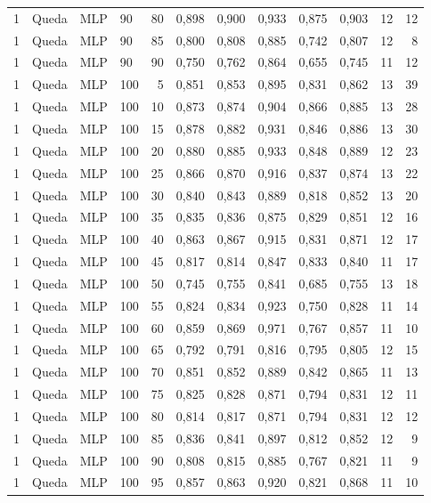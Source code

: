\begin{longtable}{ccclrrrrrrrr}
1 & Queda & MLP & 90 & 80 & 0,898 & 0,900 & 0,933 & 0,875 & 0,903 & 12 & 12 \\
1 & Queda & MLP & 90 & 85 & 0,800 & 0,808 & 0,885 & 0,742 & 0,807 & 12 & 8 \\
1 & Queda & MLP & 90 & 90 & 0,750 & 0,762 & 0,864 & 0,655 & 0,745 & 11 & 12 \\
1 & Queda & MLP & 100 & 5 & 0,851 & 0,853 & 0,895 & 0,831 & 0,862 & 13 & 39 \\
1 & Queda & MLP & 100 & 10 & 0,873 & 0,874 & 0,904 & 0,866 & 0,885 & 13 & 28 \\
1 & Queda & MLP & 100 & 15 & 0,878 & 0,882 & 0,931 & 0,846 & 0,886 & 13 & 30 \\
1 & Queda & MLP & 100 & 20 & 0,880 & 0,885 & 0,933 & 0,848 & 0,889 & 12 & 23 \\
1 & Queda & MLP & 100 & 25 & 0,866 & 0,870 & 0,916 & 0,837 & 0,874 & 13 & 22 \\
1 & Queda & MLP & 100 & 30 & 0,840 & 0,843 & 0,889 & 0,818 & 0,852 & 13 & 20 \\
1 & Queda & MLP & 100 & 35 & 0,835 & 0,836 & 0,875 & 0,829 & 0,851 & 12 & 16 \\
1 & Queda & MLP & 100 & 40 & 0,863 & 0,867 & 0,915 & 0,831 & 0,871 & 12 & 17 \\
1 & Queda & MLP & 100 & 45 & 0,817 & 0,814 & 0,847 & 0,833 & 0,840 & 11 & 17 \\
1 & Queda & MLP & 100 & 50 & 0,745 & 0,755 & 0,841 & 0,685 & 0,755 & 13 & 18 \\
1 & Queda & MLP & 100 & 55 & 0,824 & 0,834 & 0,923 & 0,750 & 0,828 & 11 & 14 \\
1 & Queda & MLP & 100 & 60 & 0,859 & 0,869 & 0,971 & 0,767 & 0,857 & 11 & 10 \\
1 & Queda & MLP & 100 & 65 & 0,792 & 0,791 & 0,816 & 0,795 & 0,805 & 12 & 15 \\
1 & Queda & MLP & 100 & 70 & 0,851 & 0,852 & 0,889 & 0,842 & 0,865 & 11 & 13 \\
1 & Queda & MLP & 100 & 75 & 0,825 & 0,828 & 0,871 & 0,794 & 0,831 & 12 & 11 \\
1 & Queda & MLP & 100 & 80 & 0,814 & 0,817 & 0,871 & 0,794 & 0,831 & 12 & 12 \\
1 & Queda & MLP & 100 & 85 & 0,836 & 0,841 & 0,897 & 0,812 & 0,852 & 12 & 9 \\
1 & Queda & MLP & 100 & 90 & 0,808 & 0,815 & 0,885 & 0,767 & 0,821 & 11 & 9 \\
1 & Queda & MLP & 100 & 95 & 0,857 & 0,863 & 0,920 & 0,821 & 0,868 & 11 & 10 \\

\end{longtable}
